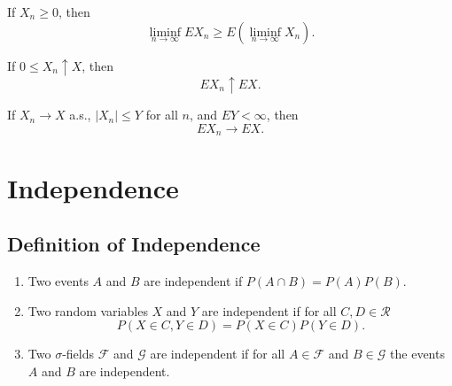 \begin{definition}[Expectation] \label{def:expectation}

\end{definition}

\begin{theorem} \label{thm:bounded-convergence-theorem}

\end{theorem}

\begin{theorem} \label{thm:fatou-lemma}
	If $X_n \geq 0$, then
	\begin{equation}
		\liminf _{n \rightarrow \infty} E X_{n} \geq E\left(\liminf _{n \rightarrow \infty} X_{n}\right).
	\end{equation}
\end{theorem}

\begin{theorem} \label{thm:monotone-convergence}
	If $0 \leq X_{n} \uparrow X$, then
	\begin{equation}
		E X_{n} \uparrow E X.
	\end{equation}
\end{theorem}

\begin{theorem} \label{thm:dominated-convergence}
	If $X_{n} \rightarrow X$ a.s., $\left|X_{n}\right| \leq Y$ for all $n$, and $E Y<\infty$, then
	\begin{equation}
		E X_{n} \rightarrow E X.
	\end{equation}
\end{theorem}

\section{Independence}

\subsection{Definition of Independence}

\begin{definition}[Independence]
	\begin{enumerate}
		\item Two events $A$ and $B$ are independent if $P(A \cap B)=P(A) P(B)$.
		\item Two random variables $X$ and $Y$ are independent if for all $C,D\in\mathcal{R}$
		      \begin{equation}
			      P(X\in C,Y\in D)=P(X\in C)P(Y\in D).
		      \end{equation}
		\item Two $\sigma$-fields $\mathcal{F}$ and $\mathcal{G}$ are independent if for all $A\in\mathcal{F}$ and $B\in\mathcal{G}$ the events $A$ and $B$ are independent.
	\end{enumerate}
\end{definition}

